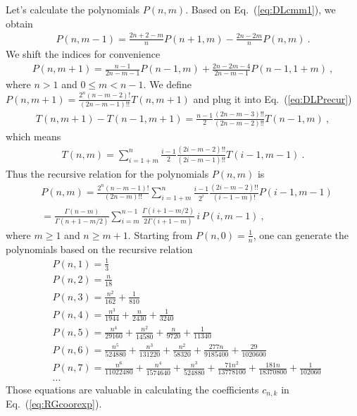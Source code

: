 \documentclass[a4paper,11pt]{article}
\begin{document}
Let's calculate the polynomials $P(n,m)$. Based on Eq.~(\ref{eq:DLcmm1}), we obtain
\begin{align}
P(n,m-1) = \frac{2n+2-m}{n} P(n+1,m) - \frac{2n-2m}{n} P(n,m) \ .
\end{align}
We shift the indices for convenience
\begin{align}\label{eq:DLPrecur}
P(n,m+1) = \frac{n-1}{2n-m-1} P(n-1,m) + \frac{2n-2m-4}{2n-m-1} P(n-1,1+m) \ ,
\end{align}
where $n>1$ and $0 \leq m < n-1$. We define $P(n,m+1) = \frac{2^n (n-m-2)!}{(2n-m-1)!!} T(n,m+1)$ and plug it into Eq.~(\ref{eq:DLPrecur})
\begin{align}
T(n,m+1) - T(n-1,m+1)= \frac{n-1}{2} \frac{(2n-m-3)!!}{(2n-m-2)!!} T(n-1,m) \ ,
\end{align}
which means 
\begin{align}
T(n,m) = \sum_{i=1+m}^{n} \frac{i-1}{2} \frac{(2i-m-2)!!}{(2i-m-1)!!} T(i-1,m-1) \ .
\end{align}
Thus the recursive relation for the polynomials $P(n,m)$ is
\begin{align}
&P(n,m) = \frac{2^n (n-m-1)!}{(2n-m)!!}\sum_{i=1+m}^{n} \frac{i-1}{2^i} \frac{(2i-m-2)!!}{(i-1-m)!} P(i-1,m-1)\nonumber\\
&= \frac{\Gamma(n-m)}{\Gamma(n+1-m/2)} \sum_{i=m}^{n-1} \frac{\Gamma(i+1-m/2)}{2\Gamma(i+1-m)} \, i \, P(i,m-1) \ ,
\end{align}
where $m \geq 1$ and $n \geq m+1$. Starting from $P(n,0) = \frac{1}{n}$, one can generate the polynomials based on the recursive relation
\begin{align}
&P(n,1) = \frac{1}{3} \nonumber\\
&P(n,2) = \frac{n}{18} \nonumber\\
&P(n,3) = \frac{n^2}{162}+\frac{1}{810} \nonumber\\
&P(n,4) = \frac{n^3}{1944}+\frac{n}{2430}+\frac{1}{3240} \nonumber\\
&P(n,5) = \frac{n^4}{29160}+\frac{n^2}{14580}+\frac{n}{9720}+\frac{1}{11340} \nonumber\\
&P(n,6) = \frac{n^5}{524880}+\frac{n^3}{131220}+\frac{n^2}{58320}+\frac{277 n}{9185400}+\frac{29}{1020600} \nonumber\\
&P(n,7) =  \frac{n^6}{11022480}+\frac{n^4}{1574640}+\frac{n^3}{524880}+\frac{71 n^2}{13778100}+\frac{181 n}{18370800}+\frac{1}{102060} \nonumber\\
&... 
\end{align}
Those equations are valuable in calculating the coefficients $c_{n,k}$ in Eq.~(\ref{eq:RGcoorexp}).
\end{document}
